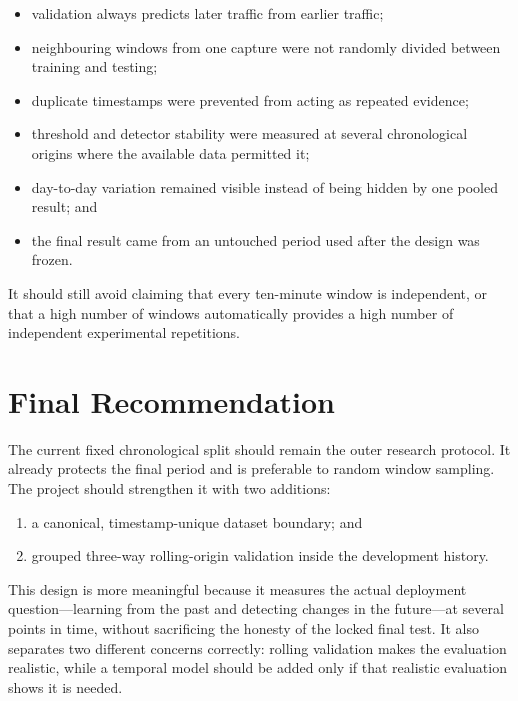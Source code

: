 \documentclass[11pt,a4paper]{article}
\begin{document}
\begin{itemize}

\item validation always predicts later traffic from earlier traffic;

\item neighbouring windows from one capture were not randomly divided between
training and testing;

\item duplicate timestamps were prevented from acting as repeated evidence;

\item threshold and detector stability were measured at several chronological
origins where the available data permitted it;

\item day-to-day variation remained visible instead of being hidden by one
pooled result; and

\item the final result came from an untouched period used after the design was
frozen.

\end{itemize}

It should still avoid claiming that every ten-minute window is independent, or
that a high number of windows automatically provides a high number of
independent experimental repetitions.

\section{Final Recommendation}

The current fixed chronological split should remain the outer research
protocol. It already protects the final period and is preferable to random
window sampling. The project should strengthen it with two additions:

\begin{enumerate}

\item a canonical, timestamp-unique dataset boundary; and

\item grouped three-way rolling-origin validation inside the development
history.

\end{enumerate}

This design is more meaningful because it measures the actual deployment
question---learning from the past and detecting changes in the future---at
several points in time, without sacrificing the honesty of the locked final
test. It also separates two different concerns correctly: rolling validation
makes the evaluation realistic, while a temporal model should be added only if
that realistic evaluation shows it is needed.
\end{document}
